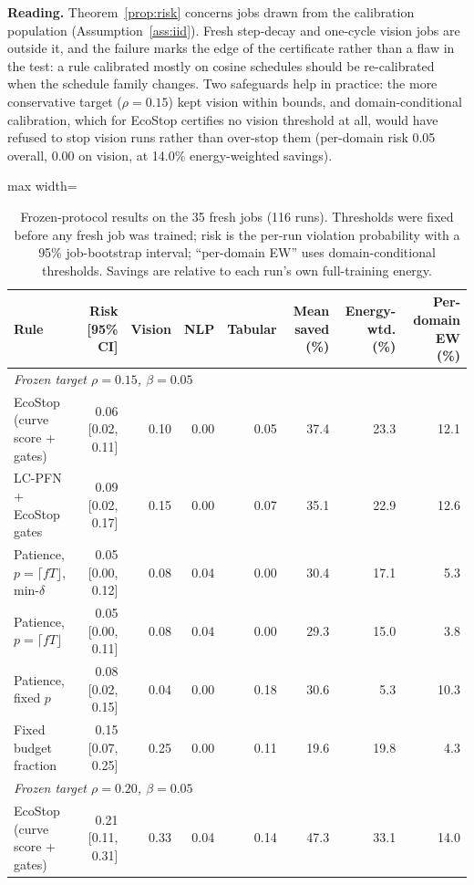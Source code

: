 \documentclass[3p,twocolumn,10pt]{elsarticle}
\theoremstyle{definition}
\begin{document}
\textbf{Reading.} Theorem~\ref{prop:risk} concerns jobs drawn from the calibration population (Assumption~\ref{ass:iid}). Fresh step-decay and one-cycle vision jobs are outside it, and the failure marks the edge of the certificate rather than a flaw in the test: a rule calibrated mostly on cosine schedules should be re-calibrated when the schedule family changes. Two safeguards help in practice: the more conservative target ($\rho=0.15$) kept vision within bounds, and domain-conditional calibration, which for EcoStop certifies no vision threshold at all, would have refused to stop vision runs rather than over-stop them (per-domain risk 0.05 overall, 0.00 on vision, at 14.0\% energy-weighted savings).

\begin{table}[t]
\centering
\caption{Frozen-protocol results on the 35 fresh jobs (116 runs). Thresholds were fixed before any fresh job was trained; risk is the per-run violation probability with a 95\% job-bootstrap interval; ``per-domain EW'' uses domain-conditional thresholds. Savings are relative to each run's own full-training energy.}
\label{tab:b1}
\footnotesize
\begin{adjustbox}{max width=\textwidth}
\begin{tabular}{p{3.6cm}rrrrrrr}
\toprule
Rule & Risk [95\% CI] & Vision & NLP & Tabular & Mean saved (\%) & Energy-wtd. (\%) & Per-domain EW (\%) \\
\midrule
\multicolumn{8}{l}{\emph{Frozen target $\rho=0.15$, $\beta=0.05$}}\\
EcoStop (curve score + gates) & 0.06 [0.02, 0.11] & 0.10 & 0.00 & 0.05 & 37.4 & 23.3 & 12.1 \\
LC-PFN + EcoStop gates & 0.09 [0.02, 0.17] & 0.15 & 0.00 & 0.07 & 35.1 & 22.9 & 12.6 \\
Patience, $p=\lceil fT\rfloor$, min-$\delta$ & 0.05 [0.00, 0.12] & 0.08 & 0.04 & 0.00 & 30.4 & 17.1 & 5.3 \\
Patience, $p=\lceil fT\rfloor$ & 0.05 [0.00, 0.11] & 0.08 & 0.04 & 0.00 & 29.3 & 15.0 & 3.8 \\
Patience, fixed $p$ & 0.08 [0.02, 0.15] & 0.04 & 0.00 & 0.18 & 30.6 & 5.3 & 10.3 \\
Fixed budget fraction & 0.15 [0.07, 0.25] & 0.25 & 0.00 & 0.11 & 19.6 & 19.8 & 4.3 \\
\midrule
\multicolumn{8}{l}{\emph{Frozen target $\rho=0.20$, $\beta=0.05$}}\\
EcoStop (curve score + gates) & 0.21 [0.11, 0.31] & 0.33 & 0.04 & 0.14 & 47.3 & 33.1 & 14.0 \\

\end{tabular}
\end{adjustbox}
\end{table}
\end{document}
